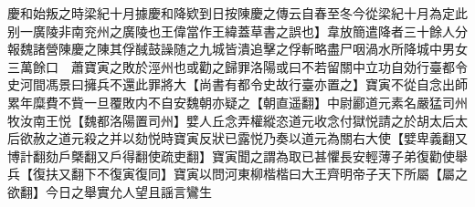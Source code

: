 慶和始叛之時梁紀十月據慶和降欵到日按陳慶之傳云自春至冬今從梁紀十月為定此别一廣陵非南兖州之廣陵也王偉當作王緯蓋草書之誤也】韋放簡遣降者三十餘人分報魏諸營陳慶之陳其俘馘鼓譟随之九城皆潰追擊之俘斬略盡尸咽渦水所降城中男女三萬餘口　蕭寶寅之敗於涇州也或勸之歸罪洛陽或曰不若留關中立功自効行臺都令史河間馮景曰擁兵不還此罪將大【尚書有都令史故行臺亦置之】寶寅不從自念出師累年糜費不貲一旦覆敗内不自安魏朝亦疑之【朝直遥翻】中尉酈道元素名嚴猛司州牧汝南王悦【魏都洛陽置司州】嬖人丘念弄權縱恣道元收念付獄悦請之於胡太后太后欲赦之道元殺之并以劾悦時寶寅反狀已露悦乃奏以道元為關右大使【嬖卑義翻又博計翻劾戶槩翻又戶得翻使疏吏翻】寶寅聞之謂為取已甚懼長安輕薄子弟復勸使舉兵【復扶又翻下不復寅復同】寶寅以問河東柳楷楷曰大王齊明帝子天下所屬【屬之欲翻】今日之舉實允人望且謡言鸞生